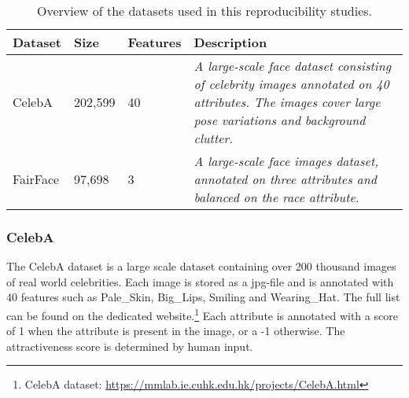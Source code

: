\begin{table}[H]
\centering
\begin{tabularx}{\linewidth}{l l l X}
\toprule
\textbf{Dataset} & \textbf{Size} & \textbf{Features} &  \textbf{Description} \\
\midrule
CelebA \cite{liu2015deep} & 202,599 & 40 & \textit{A large-scale face dataset consisting of celebrity images annotated on 40 attributes. The images cover large pose variations and background clutter.} \\
\midrule
FairFace \cite{karkkainen2021fairface} & 97,698 & 3 & \textit{A large-scale face images dataset, annotated on three attributes and balanced on the race attribute.} \\
\bottomrule
\end{tabularx}
\caption{\label{tab:dataset_table} Overview of the datasets used in this reproducibility studies.}
\end{table}

\subsubsection{CelebA} 

The CelebA dataset \cite{liu2015deep} is a large scale dataset containing over 200 thousand images of real world celebrities. Each image is stored as a jpg-file and is annotated with 40 features such as Pale\_Skin, Big\_Lips, Smiling and Wearing\_Hat. The full list can be found on the dedicated website.\footnote{CelebA dataset: \url{https://mmlab.ie.cuhk.edu.hk/projects/CelebA.html}} Each attribute is annotated with a score of 1 when the attribute is present in the image, or a -1 otherwise. The attractiveness score is determined by human input.



